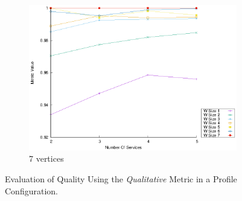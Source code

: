\begin{figure}[!htb]
\begin{subfigure}{0.33\textwidth}
    \includegraphics[width=\textwidth]{Images/graphs/window_quality_performance_diff_qual_n7_s7_50_80_n7}
    \caption{7 vertices}
    \label{fig:quality_window_average_qualitative_n7}
  \end{subfigure}

  \caption{Evaluation of Quality Using the \emph{Qualitative} Metric in a \average Profile Configuration.}  \label{fig:quality_window_average_qualitative}
\end{figure}



